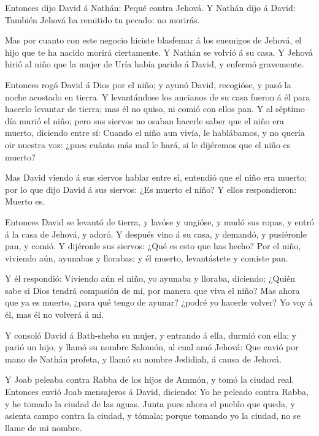  Entonces dijo David á Nathán: Pequé contra Jehová. Y
Nathán dijo á David: También Jehová ha remitido tu pecado: no morirás.

 Mas por cuanto con este negocio hiciste blasfemar á los
enemigos de Jehová, el hijo que te ha nacido morirá ciertamente.
 Y Nathán se volvió á su casa. Y Jehová hirió al niño que
la mujer de Uría había parido á David, y enfermó gravemente.

 Entonces rogó David á Dios por el niño; y ayunó David,
recogióse, y pasó la noche acostado en tierra.  Y
levantándose los ancianos de su casa fueron á él para hacerlo levantar
de tierra; mas él no quiso, ni comió con ellos pan.  Y al
séptimo día murió el niño; pero sus siervos no osaban hacerle saber que
el niño era muerto, diciendo entre sí: Cuando el niño aun vivía, le
hablábamos, y no quería oir nuestra voz: ¿pues cuánto más mal le hará,
si le dijéremos que el niño es muerto?

 Mas David viendo á sus siervos hablar entre sí, entendió
que el niño era muerto; por lo que dijo David á sus siervos: ¿Es muerto
el niño? Y ellos respondieron: Muerto es.

 Entonces David se levantó de tierra, y lavóse y ungióse, y
mudó sus ropas, y entró á la casa de Jehová, y adoró. Y después vino á
su casa, y demandó, y pusiéronle pan, y comió.  Y dijéronle
sus siervos: ¿Qué es esto que has hecho? Por el niño, viviendo aún,
ayunabas y llorabas; y él muerto, levantástete y comiste pan.

 Y él respondió: Viviendo aún el niño, yo ayunaba y
lloraba, diciendo: ¿Quién sabe si Dios tendrá compasión de mí, por
manera que viva el niño?  Mas ahora que ya es muerto, ¿para
qué tengo de ayunar? ¿podré yo hacerle volver? Yo voy á él, mas él no
volverá á mí.

 Y consoló David á Bath-sheba su mujer, y entrando á ella,
durmió con ella; y parió un hijo, y llamó su nombre Salomón, al cual amó
Jehová:  Que envió por mano de Nathán profeta, y llamó su
nombre Jedidiah, á causa de Jehová.

 Y Joab peleaba contra Rabba de los hijos de Ammón, y tomó
la ciudad real.  Entonces envió Joab mensajeros á David,
diciendo: Yo he peleado contra Rabba, y he tomado la ciudad de las
aguas.  Junta pues ahora el pueblo que queda, y asienta
campo contra la ciudad, y tómala; porque tomando yo la ciudad, no se
llame de mi nombre.

